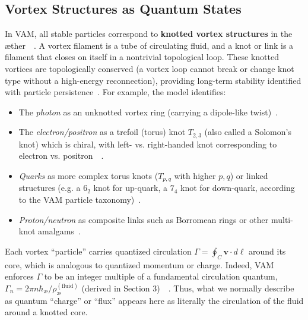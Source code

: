 \documentclass[a4paper,12pt]{article}
\begin{document}
    \subsection{Vortex Structures as Quantum States}
    In VAM, all stable particles correspond to \textbf{knotted vortex structures} in the æther~\cite{reference_22}~\cite{reference_23}. A vortex filament is a tube of circulating fluid, and a knot or link is a filament that closes on itself in a nontrivial topological loop. These knotted vortices are topologically conserved (a vortex loop cannot break or change knot type without a high-energy reconnection), providing long-term stability identified with particle persistence~\cite{reference_24}. For example, the model identifies:
    \begin{itemize}
        \item The \emph{photon} as an unknotted vortex ring (carrying a dipole-like twist)~\cite{reference_25}.
        \item The \emph{electron/positron} as a trefoil (torus) knot $T_{2,3}$ (also called a Solomon’s knot) which is chiral, with left- vs. right-handed knot corresponding to electron vs. positron~\cite{reference_26}~\cite{reference_27}.
        \item \emph{Quarks} as more complex torus knots ($T_{p,q}$ with higher $p,q$) or linked structures (e.g. a $6_2$ knot for up-quark, a $7_4$ knot for down-quark, according to the VAM particle taxonomy)~\cite{reference_28}.
        \item \emph{Proton/neutron} as composite links such as Borromean rings or other multi-knot amalgams~\cite{reference_29}.
    \end{itemize}
    Each vortex “particle” carries quantized circulation $\Gamma = \oint_C \mathbf{v}\cdot d\boldsymbol{\ell}$ around its core, which is analogous to quantized momentum or charge. Indeed, VAM enforces $\Gamma$ to be an integer multiple of a fundamental circulation quantum, $\Gamma_n = 2\pi n \hbar_{\text{\ae}}/\rho_{\text{\ae}}^{(\text{fluid})}$ (derived in Section 3)~\cite{reference_30}~\cite{reference_31}. Thus, what we normally describe as quantum “charge” or “flux” appears here as literally the circulation of the fluid around a knotted core.
\end{document}
